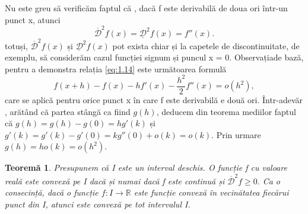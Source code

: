 \documentclass[a4paper,12pt,oneside]{report}
\newtheorem{theorem}{Teorem\u a}
\begin{document}
Nu este greu să verificăm faptul că , dacă f este derivabilă de doua ori într-un punct x, atunci 
\begin{displaymath}
   \overline{ \mathcal{D}}^{2}f\left ( x \right ) = \underline{\mathcal{D}}^{2}f\left ( x \right ) = {f}''\left ( x \right ). \label{eq:1.14} \tag{eq1.14}
\end{displaymath}
totuși, \(\overline{ \mathcal{D}}^{2}f\left ( x \right )\) și \(\underline{\mathcal{D}}^{2}f\left ( x \right )\) pot exista chiar și la capetele de discontinuitate, de exemplu, să considerăm cazul funcției signum și puncul x = 0. Observațiade bază, pentru a demonstra relația \ref{eq:1.14}  este următoarea formulă
\begin{displaymath}
   f\left ( x + h \right ) - f\left ( x \right ) - h{f}'\left ( x \right ) - \frac{h^{2}}{2}{f}''\left ( x \right ) = o\left ( h^{2} \right ), 
\end{displaymath}
care se aplică pentru orice punct x în care f este derivabilă e două ori. Într-adevăr , arătând că partea stângă ca fiind \(g\left ( h \right )\), deducem din teorema mediilor faptul că \(g\left ( h \right ) = g \left ( h \right ) - g\left ( 0 \right ) = h{g}'\left ( k \right )\) și  \({g}'\left ( k \right ) = {g}'\left ( k \right ) - {g}'\left ( 0 \right ) = k{g}''\left ( 0 \right ) +o\left ( k \right ) = o\left ( k \right ). \)
	Prin urmare \(g\left ( h \right ) = ho\left ( k \right ) = o\left ( h^{2} \right ). \)
\begin{theorem}
Presupunem că I este un interval deschis. O funcție f cu valoare reală este convexă pe I dacă și numai dacă f este continuă și  \(\overline{ \mathcal{D}}^{2}f\geq 0.\) 
	Ca o consecință, dacă o funcție \(f : I \rightarrow \mathbb{R}\) este  funcție convexă  în vecinătatea fiecărui punct din I, atunci este convexă pe tot intervalul I. 
\end{theorem}
\end{document}
